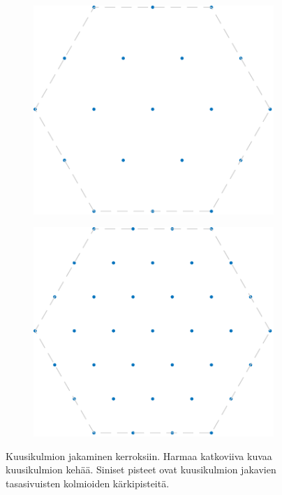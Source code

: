 \begin{figure}[H]
\begin{subfigure}[t]{.225\textwidth}
        \caption{}
    \end{subfigure}%
    \begin{subfigure}[t]{.225\textwidth}
        \includegraphics[width=.9\linewidth]{kuvat/6kulmio2.pdf}
        \caption{}
    \end{subfigure}%
    \begin{subfigure}[t]{.225\textwidth}
        \includegraphics[width=.9\linewidth]{kuvat/6kulmio3.pdf}
        \caption{}
    \end{subfigure}%
    \caption{Kuusikulmion jakaminen kerroksiin. Harmaa katkoviiva kuvaa kuusikulmion kehää. Siniset pisteet ovat kuusikulmion jakavien tasasivuisten kolmioiden kärkipisteitä.}
    \label{fig:6kulmio}
\end{figure}

